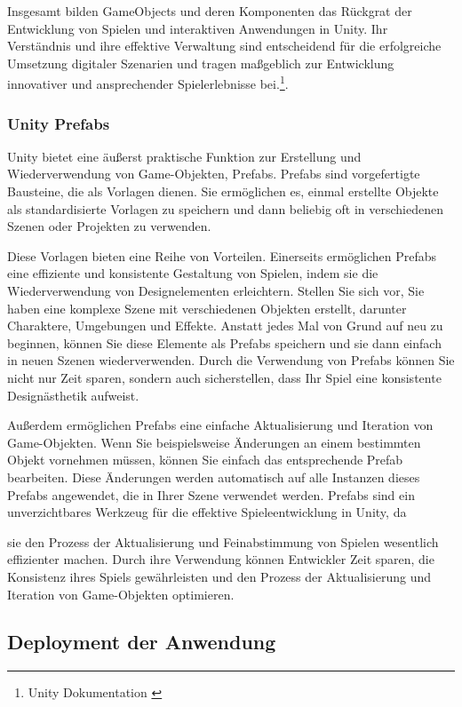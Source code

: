 Insgesamt bilden GameObjects und deren Komponenten das Rückgrat der Entwicklung von Spielen und interaktiven Anwendungen in
Unity. Ihr Verständnis und ihre effektive Verwaltung sind entscheidend für die erfolgreiche Umsetzung digitaler Szenarien
und tragen maßgeblich zur Entwicklung innovativer und ansprechender Spielerlebnisse bei.\footnote{Unity Dokumentation \cite{GameObjects}}.

\subsubsection{Unity Prefabs} 
Unity bietet eine äußerst praktische Funktion zur Erstellung und Wiederverwendung von Game-Objekten, Prefabs. Prefabs sind
vorgefertigte Bausteine, die als Vorlagen dienen. Sie ermöglichen es, einmal erstellte Objekte als standardisierte Vorlagen
zu speichern und dann beliebig oft in verschiedenen Szenen oder Projekten zu verwenden.

Diese Vorlagen bieten eine Reihe von Vorteilen. Einerseits ermöglichen Prefabs eine effiziente und konsistente Gestaltung
von Spielen, indem sie die Wiederverwendung von Designelementen erleichtern. Stellen Sie sich vor, Sie haben eine komplexe
Szene mit verschiedenen Objekten erstellt, darunter Charaktere, Umgebungen und Effekte. Anstatt jedes Mal von Grund auf
neu zu beginnen, können Sie diese Elemente als Prefabs speichern und sie dann einfach in neuen Szenen wiederverwenden.
Durch die Verwendung von Prefabs können Sie nicht nur Zeit sparen, sondern auch sicherstellen, dass Ihr Spiel eine
konsistente Designästhetik aufweist.

Außerdem ermöglichen Prefabs eine einfache Aktualisierung und Iteration von Game-Objekten. Wenn Sie beispielsweise
Änderungen an einem bestimmten Objekt vornehmen müssen, können Sie einfach das entsprechende Prefab bearbeiten. Diese
Änderungen werden automatisch auf alle Instanzen dieses Prefabs angewendet, die in Ihrer Szene verwendet werden. Prefabs
sind ein unverzichtbares Werkzeug für die effektive Spieleentwicklung in Unity, da

sie den Prozess der Aktualisierung und Feinabstimmung von Spielen wesentlich effizienter machen. Durch ihre Verwendung
können Entwickler Zeit sparen, die Konsistenz ihres Spiels gewährleisten und den Prozess der Aktualisierung und Iteration
von Game-Objekten optimieren.

\subsection{Deployment der Anwendung} 

